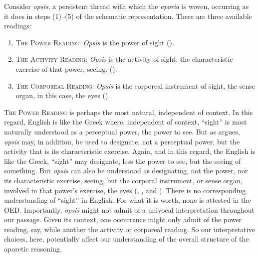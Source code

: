Consider \emph{opsis}, a persistent thread with which the \emph{aporia} is woven, occurring as it does in steps (1)–(5) of the schematic representation. There are three available readings:
\begin{enumerate}[(1)]
	\item \textsc{The Power Reading}: \emph{Opsis} is the power of sight (\citealt{Johansen:2005hz}).
	\item \textsc{The Activity Reading}: \emph{Opsis} is the activity of sight, the characteristic exercise of that power, seeing. (\citealt{caston02}).
	\item \textsc{The Corporeal Reading}: \emph{Opsis} is the corporeal instrument of sight, the sense organ, in this case, the eyes (\citealt{Trubowitz:2025aa}).
\end{enumerate}
\textsc{The Power Reading} is perhaps the most natural, independent of context. In this regard, English is like the Greek where, independent of context, ``sight'' is most naturally understood as a perceptual power, the power to see. But as \citet{caston02} argues, \emph{opsis} may, in addition, be used to designate, not a perceptual power, but the activity that is its characteristic exercise. Again, and in this regard, the English is like the Greek, ``sight'' may designate, less the power to see, but the seeing of something. But \emph{opsis} can also be understood as designating, not the power, nor its characteristic exercise, seeing, but the corporal instrument, or sense organ, involved in that power's exercise, the eyes (\citealt[]{Bonitz:1870aa}, \citealt[]{Hicks:1907uq}, \citealt[]{Ross:1961uq} and \citealt{Trubowitz:2025aa}). There is no corresponding understanding of ``sight'' in English. For what it is worth, none is attested in the OED. Importantly, \emph{opsis} might not admit of a univocal interpretation throughout our passage. Given its context, one occurrence might only admit of the power reading, say, while another the activity or corporeal reading. So our interpretative choices, here, potentially affect our understanding of the overall structure of the aporetic reasoning.

